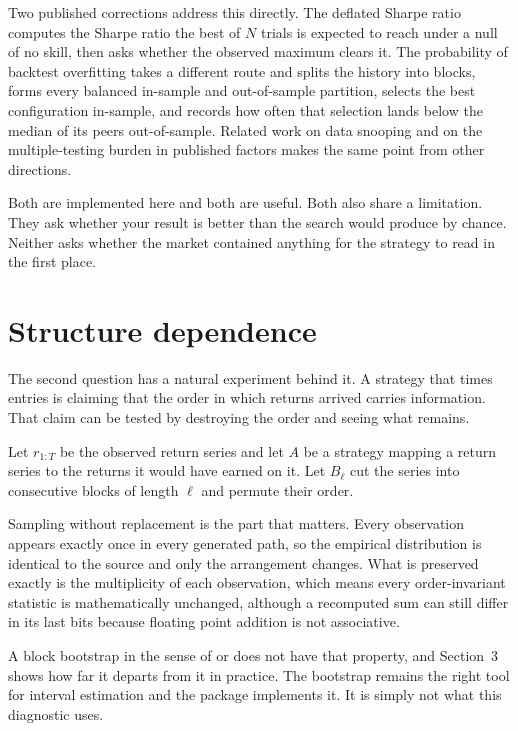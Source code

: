 \documentclass[11pt]{article}
\begin{document}
Two published corrections address this directly. The deflated Sharpe ratio \citep{bailey2014deflated} computes the Sharpe ratio the best of $N$ trials is expected to reach under a null of no skill, then asks whether the observed maximum clears it. The probability of backtest overfitting \citep{bailey2016pbo} takes a different route and splits the history into blocks, forms every balanced in-sample and out-of-sample partition, selects the best configuration in-sample, and records how often that selection lands below the median of its peers out-of-sample. Related work on data snooping \citep{white2000reality} and on the multiple-testing burden in published factors \citep{harvey2015backtesting} makes the same point from other directions.

Both are implemented here and both are useful. Both also share a limitation. They ask whether your result is better than the search would produce by chance. Neither asks whether the market contained anything for the strategy to read in the first place.

\section{Structure dependence}

The second question has a natural experiment behind it. A strategy that times entries is claiming that the order in which returns arrived carries information. That claim can be tested by destroying the order and seeing what remains.

Let $r_{1:T}$ be the observed return series and let $A$ be a strategy mapping a return series to the returns it would have earned on it. Let $B_\ell$ cut the series into consecutive blocks of length $\ell$ and permute their order.

Sampling without replacement is the part that matters. Every observation appears exactly once in every generated path, so the empirical distribution is identical to the source and only the arrangement changes. What is preserved exactly is the multiplicity of each observation, which means every order-invariant statistic is mathematically unchanged, although a recomputed sum can still differ in its last bits because floating point addition is not associative.

A block bootstrap in the sense of \citet{kunsch1989jackknife} or \citet{politis1994stationary} does not have that property, and Section~3 shows how far it departs from it in practice. The bootstrap remains the right tool for interval estimation and the package implements it. It is simply not what this diagnostic uses.
\end{document}
